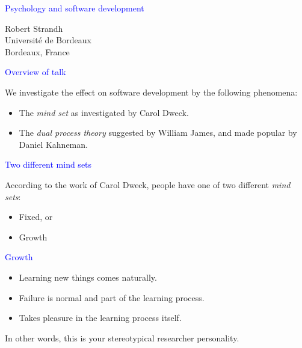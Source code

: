 \documentclass{slides}
\newcommand{\ti}[1]{\begin{center}\Large{\textcolor{blue}{#1}}\end{center}}
\begin{document}
\landscape
\setlength{\oddsidemargin}{1cm}
\setlength{\evensidemargin}{1cm}
\setlength{\marginparwidth}{1cm}
\setlength{\parskip}{0.5cm}
\setlength{\parindent}{0cm}
\begin{slide}\ti{Psychology and software development}
\vskip 0.5cm
\begin{center}
Robert Strandh \\
Université de Bordeaux \\
Bordeaux, France
\end{center}
\vfill\end{slide}
\begin{slide}\ti{Overview of talk}

We investigate the effect on software development by the following
phenomena:

  \begin{itemize}
  \item The \emph{mind set} as investigated by Carol Dweck.
  \item The \emph{dual process theory} suggested by William James, and
    made popular by Daniel Kahneman.
  \end{itemize}

\vfill\end{slide}
\begin{slide}\ti{Two different mind sets}

According to the work of Carol Dweck, people have one of two different
\emph{mind sets}:

\begin{itemize}
\item Fixed, or
\item Growth
\end{itemize}

\vfill\end{slide}
\begin{slide}\ti{Growth}

  \begin{itemize}
  \item Learning new things comes naturally.
  \item Failure is normal and part of the learning process.
  \item Takes pleasure in the learning process itself.
  \end{itemize}

In other words, this is your stereotypical researcher personality.

\vfill\end{slide}
\end{document}
